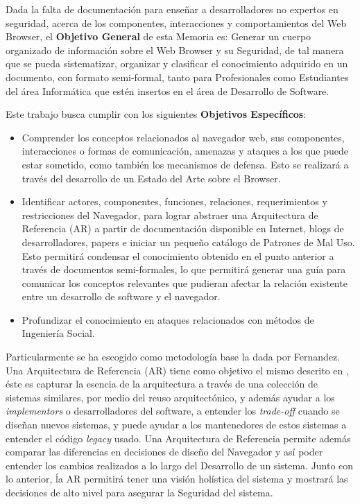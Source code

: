 Dada la falta de documentación para enseñar a desarrolladores no expertos en seguridad, acerca de los componentes, interacciones y comportamientos del Web Browser, el \textbf{Objetivo General} de esta Memoria es: Generar un cuerpo organizado de información sobre el Web Browser y su Seguridad, de tal manera que se pueda sistematizar, organizar y clasificar el conocimiento adquirido en un documento, con formato semi-formal, tanto para Profesionales como Estudiantes del área Informática que estén insertos en el área de Desarrollo de Software.

Este trabajo busca cumplir con los siguientes \textbf{Objetivos Específicos}:

\begin{itemize}
	\item Comprender los conceptos relacionados al navegador web, sus componentes, interacciones o formas de comunicación, amenazas y ataques a los que puede estar sometido, como también los mecanismos de defensa. Esto se realizará a través del desarrollo de un Estado del Arte sobre el Browser.
	\item Identificar actores, componentes, funciones, relaciones, requerimientos y restricciones del Navegador, para lograr abstraer una Arquitectura de Referencia (AR) a partir de documentación disponible en Internet, blogs de desarrolladores, papers e iniciar un pequeño catálogo de Patrones de Mal Uso. Esto permitirá condensar el conocimiento obtenido en el punto anterior a través de documentos semi-formales, lo que permitirá generar una guía para comunicar los conceptos relevantes que pudieran afectar la relación existente entre un desarrollo de software y el navegador.
	\item Profundizar el conocimiento en ataques relacionados con métodos de Ingeniería Social.
	
\end{itemize} 

Particularmente se ha escogido como metodología base la dada por Fernandez\cite{braz2008eliciting,fernandez2013security}. Una Arquitectura de Referencia (AR) tiene como objetivo el mismo descrito en \cite{2005-grosskurth-browser-refarch, preprint-grosskurth-browser-archevol, Avgeriou2003, Galster2011a}, éste es capturar la esencia de la arquitectura a través de una colección de sistemas similares, por medio del reuso arquitectónico, y además ayudar a los \textit{implementors} o desarrolladores del software, a entender los \textit{trade-off} cuando se diseñan nuevos sistemas, y puede ayudar a los mantenedores de estos sistemas a entender el código \textit{legacy} usado. Una Arquitectura de Referencia permite además comparar las diferencias en decisiones de diseño del Navegador y así poder entender los cambios realizados a lo largo del Desarrollo de un sistema. Junto con lo anterior, ĺa AR permitirá tener una visión holística del sistema y mostrará las decisiones de alto nivel para asegurar la Seguridad del sistema. 

